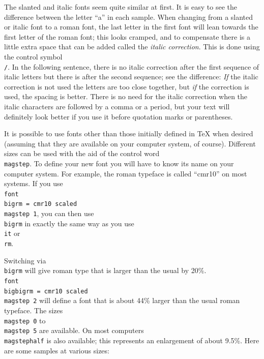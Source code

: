 The slanted and italic fonts seem quite similar at first.  It is 
easy to see the difference between the letter ``a'' in each 
sample. When changing from a slanted or italic font to a roman 
font, the last letter in the first font will lean towards the 
first letter of the roman font; this looks cramped, and to 
compensate there is a little extra space that can be added called 
the {\sl italic correction}. This is done using the control 
symbol {\tt \\/}. 
\toindex{/} 
In the following sentence, there is no italic correction after 
the first sequence of italic letters but there is after the 
second sequence; see the difference: {\it If} the italic 
correction is not used the letters are too close together, but 
{\it if\/} the correction is used, the spacing is better.  There 
is no need for the italic correction when the italic characters 
are followed by a comma or a period, but your text will 
definitely look better if you use it before quotation marks or 
parentheses. 


It is possible to use fonts other than those initially defined in 
\TeX{} when desired (assuming that they are available on 
your computer system, of course).  Different sizes can be used 
with the aid of the control word {\tt \\magstep}. To define your 
new font you will have to know its name on your computer system. 
For example, the roman typeface is called ``cmr10'' on most 
systems.  If you use {\tt \\font\\bigrm = cmr10 scaled \\magstep 
1}, you can then use {\tt\\bigrm} in exactly the same way as you 
use {\tt\\it} or {\tt\\rm}. 

Switching via {\tt\\bigrm} will give roman type that is larger 
than the usual by 20\%\null.  {\tt \\font\\bigbigrm = cmr10 
scaled \\magstep 2} will define a font that is about 44\% larger 
than the usual roman typeface.  The sizes {\tt \\magstep~0} to 
{\tt \\magstep~5} are available.  On most computers {\tt \\magstephalf} 
is also available; this represents an enlargement of 
about 9.5\%\null. Here are some samples at various sizes: 

